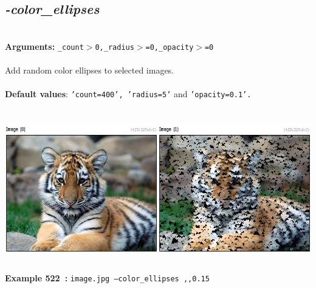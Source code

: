 \documentclass[a4paper,11pt,twoside]{book}
\begin{document}
\subsection{\emph{-color\_ellipses} }\vspace*{-0.5em}
~\\\textbf{Arguments: } 
{\small \texttt{\_count$>$0,\_radius$>$=0,\_opacity$>$=0}}\\~\\
Add random color ellipses to selected images.
~\\~\\\textbf{Default values}: {\small \texttt{'count=400', 'radius=5'} and \texttt{'opacity=0.1'.}}
\begin{center}\includegraphics[keepaspectratio=true,height=7cm,width=\textwidth]{img/gmic_def522.jpg}\\
{\footnotesize \textbf{Example 522~:} \texttt{image.jpg --color\_ellipses ,,0.15}}
\end{center}
\end{document}
